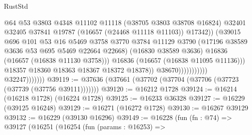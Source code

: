 \begin{lexlean}{RustStd}
\begin{coremodule}
                                                  @64
                                                  @53
                                                  @3803
                                                  @4348
                                                  @11102
                                                  @11118
                                                  (@38705 @3803 @38708 @16824)
                                                  @32401
                                                  @32405
                                                  @37841
                                                  @19787
                                                  (@16657 (@24468 @11118 @11103))
                                                  @17342))
                                              (@39015
                                                @696
                                                @101
                                                @53
                                                @16
                                                @5469
                                                @3758
                                                @3770
                                                @3784
                                                @11129
                                                @3790
                                                (@17196 @38589 @3636 @53 @695 @5469 @22664 @22668)
                                                (@16830 @38589 @3636)
                                                @16836
                                                (@16657 (@16838 @11130 @3758)))
                                              @16836
                                              (@16657 (@16838 @11095 @11136)))
                                            @18357
                                            @18360
                                            @18363
                                            @18367
                                            @18372
                                            @18378))
                                        @38670)))))))))))
                  @32247)))))))
@39119 := @37636 (@37661 (@37702 (@37704 (@37706 (@37723 (@37739 (@37756 @39111)))))))
@39120 := @16212 @1728
@39124 := @16214 (@16218 @1728) (@16224 @1728)
@39125 := @16233 @36328
@39127 := @16229 (@39125 @16248)
@39129 := @16271 (@16272 @1728)
@39130 := @16267 @39129
@39132 := @16229 (@39130 @16296)
@39149 := @16228
    (fun (fn : @74) =>
    @39127
      (@16251
        (@16254
          (fun (params : @16253) =>

\end{coremodule}
\end{lexlean}
